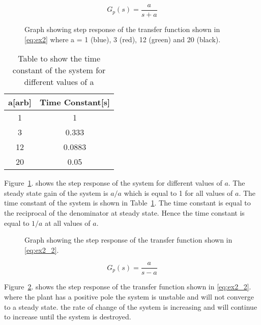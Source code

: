 \renewcommand{\ex}{ex2} 

\begin{equation}
    G_{p}\left(s\right)=\frac{a}{s+a}
    \label{eq:\ex}
\end{equation}

\begin{figure}[ht!]
    \centering
    
    \caption{Graph showing step response of the transfer function shown in \eqref{eq:\ex} where a = 1 (blue), 3 (red), 12 (green) and 20 (black). \appendixamble{\ex}} 
    \label{fig:\ex}
\end{figure}\FloatBarrier

\begin{table}[ht!]
    \centering
    \begin{tabular}{|c|c|}
        \hline
        a{[}arb{]} & Time Constant{[}s{]} \\ \hline
        1          & 1                    \\ \hline
        3          & 0.333                \\ \hline
        12         & 0.0883               \\ \hline
        20         & 0.05                 \\ \hline
    \end{tabular}
    \caption{Table to show the time constant of the system for different values of a}
    \label{tab:\ex}
\end{table}\FloatBarrier

Figure~\ref{fig:\ex}. shows the step response of the system for different values of $a$. The steady state gain of the system is $a/a$ which is equal to 1 for all values of $a$. The time constant of the system is shown in Table~\ref{tab:\ex}. The time constant is equal to the reciprocal of the denominator at steady state. Hence the time constant is equal to $1/a$ at all values of $a$.\\

\begin{figure}[ht!]
    \centering
    
    \caption{Graph showing the step response of the transfer function shown in \eqref{eq:\ex_2}.\appendixamble{\ex}}
    \label{fig:\ex_2}
\end{figure}\FloatBarrier

\begin{equation}
    G_{p}\left(s\right)=\frac{a}{s-a}
    \label{eq:\ex_2}
\end{equation}

Figure~\ref{fig:\ex_2}. shows the step response of the transfer function shown in \eqref{eq:\ex_2}. where the plant has a positive pole the system is unstable and will not converge to a steady state. the rate of change of the system is increasing and will continue to increase until the system is destroyed. 

